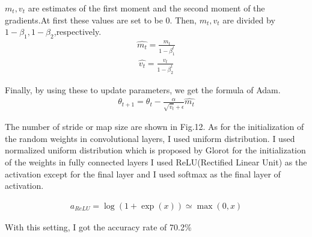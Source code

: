 $m_{t},v_{t}$ are estimates of the first moment and the second moment of the gradients.At first these values are set to be 0.
Then, $m_{t},v_{t}$ are divided by$1-\beta_{1},1-\beta_{2}$,respectively.
\begin{eqnarray}
 \hat{m_{t}}=\frac{m_{t}}{1-\beta^{t}_{1}}
 \end{eqnarray}
 \begin{eqnarray}
 \hat{v_{t}}=\frac{v_{t}}{1-\beta^{t}_{2}}
 \end{eqnarray}

Finally, by using these to update parameters, we get the formula of Adam.
 \begin{eqnarray}
 \theta_{t+1}=\theta_{t}-\frac{\alpha}{\sqrt{\hat{v_{t}}}+\epsilon}\hat{m_{t}}
 \end{eqnarray}

The number of stride or map size are shown in Fig.12.
As for the initialization of the random weights in convolutional layers, I used uniform distribution.
I used normalized uniform distribution which is proposed by Glorot\cite{Glorot} for the initialization of the weights in fully connected layers
I used ReLU(Rectified Linear Unit) as the activation except for the final layer and I used softmax as the final layer of activation.


\begin{eqnarray}
 a_{ReLU}=\log(1+\exp(x)) \simeq \max(0,x)
\end{eqnarray}


With this setting, I got the accuracy rate of 70.2\%
